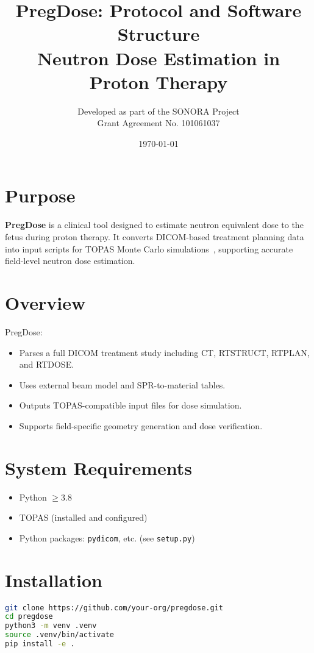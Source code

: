 \documentclass[11pt]{article}
\title{\textbf{PregDose: Protocol and Software Structure}\\Neutron Dose Estimation in Proton Therapy}
\author{Developed as part of the SONORA Project \\ Grant Agreement No. 101061037}
\date{\today}
\begin{document}
\maketitle

\section{Purpose}

\textbf{PregDose} is a clinical tool designed to estimate neutron equivalent dose to the fetus during proton therapy. It converts DICOM-based treatment planning data into input scripts for TOPAS Monte Carlo simulations~\cite{perl_topas_2012}, supporting accurate field-level neutron dose estimation.

\section{Overview}

PregDose:
\begin{itemize}[topsep=0pt,itemsep=1pt]
    \item Parses a full DICOM treatment study including CT, RTSTRUCT, RTPLAN, and RTDOSE.
    \item Uses external beam model and SPR-to-material tables.
    \item Outputs TOPAS-compatible input files for dose simulation.
    \item Supports field-specific geometry generation and dose verification.
\end{itemize}

\section{System Requirements}
\begin{itemize}
    \item Python $\geq 3.8$
    \item TOPAS (installed and configured)
    \item Python packages: \texttt{pydicom}, etc. (see \texttt{setup.py})
\end{itemize}

\section{Installation}

\begin{lstlisting}[language=bash]
git clone https://github.com/your-org/pregdose.git
cd pregdose
python3 -m venv .venv
source .venv/bin/activate
pip install -e .
\end{lstlisting}
\end{document}

